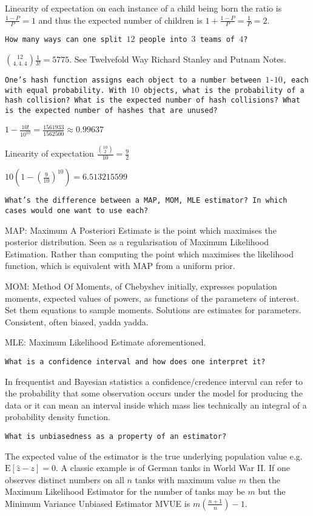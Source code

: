 Linearity of expectation on each instance of a child being born the ratio is $\frac{1-P}{P}=\boxed{1}$ and thus the expected number of children is $1+\frac{1-P}{P}=\frac{1}{P}=\boxed{2}$.

\texttt{How many ways can one split $12$ people into $3$ teams of $4$?}

$ \binom{12}{4,4,4} \frac{1}{3!} = \boxed{5775}$. See Twelvefold Way Richard Stanley and Putnam Notes.

\texttt{One's hash function assigns each object to a number between $1$-$10$, each with equal probability. With $10$ objects, what is the probability of a hash collision? What is the expected number of hash collisions? What is the expected number of hashes that are unused?}

$1-\frac{10!}{10^{10}} = \boxed{\frac{1561933}{1562500}}\approx 0.99637$

Linearity of expectation $\frac{\binom{10}{2}}{10}=\boxed{\frac{9}{2}}$

$10\left(1-\left( \frac{9}{10} \right)^{10} \right)=\boxed{6.513215599}$

\texttt{What's the difference between a MAP, MOM, MLE estimator? In which cases would one want to use each?}

MAP: Maximum A Posteriori Estimate is the point which maximises the posterior distribution. Seen as a regularisation of Maximum Likelihood Estimation. Rather than computing the point which maximises the likelihood function, which is equivalent with MAP from a uniform prior.

MOM: Method Of Moments, of Chebyshev initially, expresses population moments, expected values of powers, as functions of the parameters of interest. Set them equations to sample moments. Solutions are estimates for parameters. Consistent, often biased, yadda yadda.

MLE: Maximum Likelihood Estimate aforementioned.

\texttt{What is a confidence interval and how does one interpret it?}

In frequentist and Bayesian statistics a confidence/credence interval can refer to the probability that some observation occurs under the model for producing the data or it can mean an interval inside which mass lies technically an integral of a probability density function.

\texttt{What is unbiasedness as a property of an estimator?}

The expected value of the estimator is the true underlying population value e.g. $\text{E}[\hat{z}-z] = 0$. A classic example is of German tanks in World War II. If one observes distinct numbers on all $n$ tanks with maximum value $m$ then the Maximum Likelihood Estimator for the number of tanks may be $m$ but the Minimum Variance Unbiased Estimator MVUE is $m \left ( \frac{n+1}{n} \right ) - 1$.

